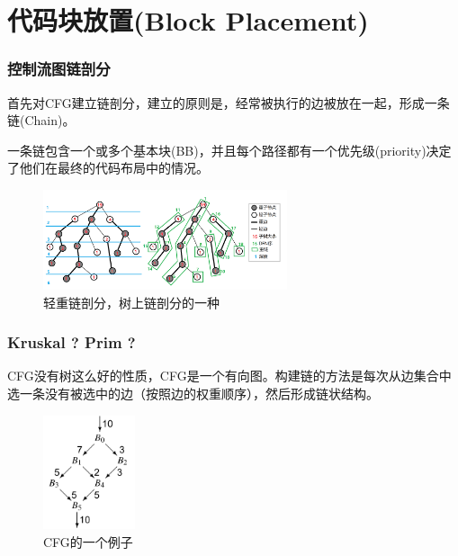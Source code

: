 \section{代码块放置(Block Placement)}

\begin{frame}
    \frametitle{控制流图链剖分}

    首先对CFG建立链剖分，建立的原则是，经常被执行的边被放在一起，形成一条链(Chain)。

    一条链包含一个或多个基本块(BB)，并且每个路径都有一个优先级(priority)决定了他们在最终的代码布局中的情况。

    \begin{figure}
        \centering
        \includegraphics[width=0.64\textwidth]{images/hld.png}
        \caption{\cite{unknown-author-2022}轻重链剖分，树上链剖分的一种}
    \end{figure}

\end{frame}


\begin{frame}[fragile]
    \frametitle{Kruskal ? Prim ?}

    CFG没有树这么好的性质，CFG是一个有向图。构建链的方法是每次从边集合中选一条没有被选中的边（按照边的权重顺序），然后形成链状结构。

    \begin{figure}
        \centering
        \includegraphics[width=0.24\textwidth]{images/example_cfg.png}
        \caption{CFG的一个例子\cite{cooper2011engineering}}
    \end{figure}



\end{frame}

